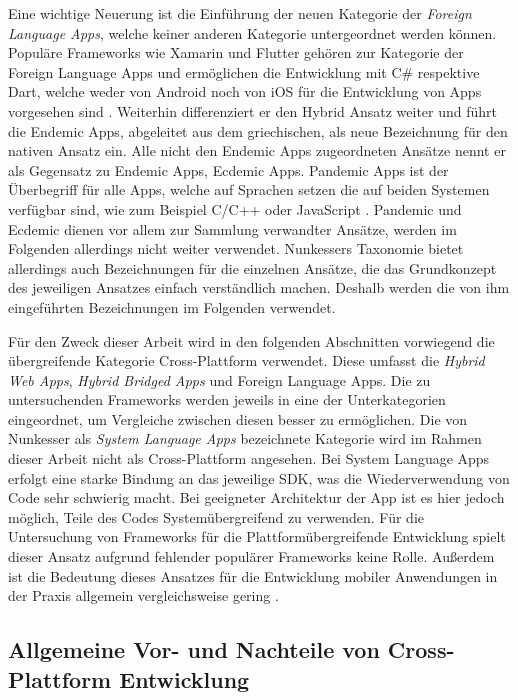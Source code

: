 Eine wichtige Neuerung ist die Einführung der neuen Kategorie der \textit{Foreign Language Apps}, welche keiner anderen Kategorie untergeordnet werden können.
Populäre Frameworks wie Xamarin und Flutter gehören zur Kategorie der Foreign Language Apps und ermöglichen die Entwicklung mit C\# respektive Dart, welche weder von Android noch von iOS für die Entwicklung von Apps vorgesehen sind \cite{Xamarin_Homepage,Flutter_Architektur}.
Weiterhin differenziert er den Hybrid Ansatz weiter und führt die Endemic Apps, abgeleitet aus dem griechischen, als neue Bezeichnung für den nativen Ansatz ein.
Alle nicht den Endemic Apps zugeordneten Ansätze nennt er als Gegensatz zu Endemic Apps, Ecdemic Apps.
Pandemic Apps ist der Überbegriff für alle Apps, welche auf Sprachen setzen die auf beiden Systemen verfügbar sind, wie zum Beispiel C/C++ oder JavaScript \cite{Nunkesser_Taxonomy_Apps}.
Pandemic und Ecdemic dienen vor allem zur Sammlung verwandter Ansätze, werden im Folgenden allerdings nicht weiter verwendet.
Nunkessers Taxonomie bietet allerdings auch Bezeichnungen für die einzelnen Ansätze, die das Grundkonzept des jeweiligen Ansatzes einfach verständlich machen.
Deshalb werden die von ihm eingeführten Bezeichnungen im Folgenden verwendet.

Für den Zweck dieser Arbeit wird in den folgenden Abschnitten vorwiegend die übergreifende Kategorie Cross-Plattform verwendet.
Diese umfasst die \textit{Hybrid Web Apps}, \textit{Hybrid Bridged Apps} und Foreign Language Apps.
Die zu untersuchenden Frameworks werden jeweils in eine der Unterkategorien eingeordnet, um Vergleiche zwischen diesen besser zu ermöglichen.
Die von Nunkesser als \textit{System Language Apps} bezeichnete Kategorie wird im Rahmen dieser Arbeit nicht als Cross-Plattform angesehen.
Bei System Language Apps erfolgt eine starke Bindung an das jeweilige \ac{SDK}, was die Wiederverwendung von Code sehr schwierig macht.
Bei geeigneter Architektur der App ist es hier jedoch möglich, Teile des Codes Systemübergreifend zu verwenden.
Für die Untersuchung von Frameworks für die Plattformübergreifende Entwicklung spielt dieser Ansatz aufgrund fehlender populärer Frameworks keine Rolle.
Außerdem ist die Bedeutung dieses Ansatzes für die Entwicklung mobiler Anwendungen in der Praxis allgemein vergleichsweise gering \cite{Nunkesser_Taxonomy_Apps}.


\subsection{Allgemeine Vor- und Nachteile von Cross-Plattform Entwicklung}
\label{sec:crossplattform_vorteile}

